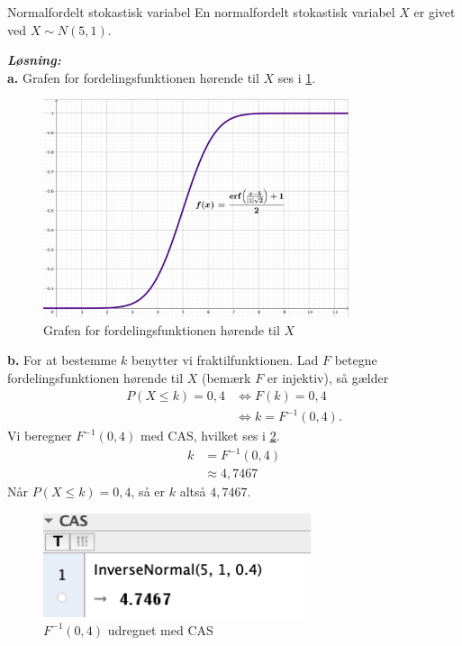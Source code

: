 \documentclass{article}
\newcommand{\sol}{\setlength{\parindent}{0cm}\textbf{\textit{Løsning:}}\setlength{\parindent}{1cm}}
\begin{document}
\begin{question}{Normalfordelt stokastisk variabel}{}
  En normalfordelt stokastisk variabel $X$ er givet ved $X \sim N(5,1)$. 
\end{question}
\sol \\
\textbf{a.}
Grafen for fordelingsfunktionen hørende til $X$ ses i \cref{fig:fordeling}. 
\begin{figure}[H]
\begin{center}
  \includegraphics[width=0.8\textwidth]{fordeling.png}
\end{center}
\caption{Grafen for fordelingsfunktionen hørende til $X$}
\label{fig:fordeling}
\end{figure}
\noindent \textbf{b.}
For at bestemme $k$ benytter vi fraktilfunktionen.
Lad $F$ betegne fordelingsfunktionen hørende til $X$ (bemærk $F$ er injektiv), så gælder
\begin{equation*}
\begin{split}
  P(X \leq k) =0,4 &\iff F(k) =0,4 \\
  &\iff k=F ^{-1}(0,4).
\end{split}
\end{equation*}
Vi beregner $F ^{-1}(0,4)$ med CAS, hvilket ses i \cref{fig:fraktil04}.
\begin{equation*}
\begin{split}
  k&=F ^{-1}(0,4)\\
  &\approx 4,7467
\end{split}
\end{equation*}
Når $P(X \leq k) =0,4$, så er $k$ altså $4,7467$. 
\begin{figure}[H]
\begin{center}
  \includegraphics[width=0.7\textwidth]{fraktil04}
\end{center}
  \caption{$F ^{-1}(0,4)$ udregnet med CAS }
\label{fig:fraktil04}
\end{figure}
\end{document}
